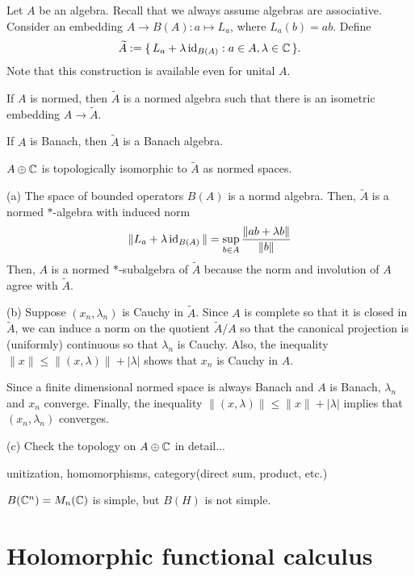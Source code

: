 \documentclass{../../large}
\begin{document}
\begin{prb}[Unitization]
Let $A$ be an algebra.
Recall that we always assume algebras are associative.
Consider an embedding $A\to B(A):a\mapsto L_a$, where $L_a(b)=ab$.
Define
\[\widetilde A:=\{\,L_a+\lambda\operatorname{id}_{B(A)}:a\in A,\lambda\in\mathbb{C}\,\}.\]
Note that this construction is available even for unital $A$.
\begin{parts}
\item If $A$ is normed, then $\tilde A$ is a normed algebra such that there is an isometric embedding $A\to\tilde A$.
\item If $A$ is Banach, then $\tilde A$ is a Banach algebra.
\item $A\oplus\mathbb{C}$ is topologically isomorphic to $\tilde A$ as normed spaces.
\end{parts}
\end{prb}
\begin{pf}
(a)
The space of bounded operators $B(A)$ is a normd algebra.
Then, $\tilde A$ is a normed $*$-algebra with induced norm
\[\|L_a+\lambda\operatorname{id}_{B(A)}\|=\sup_{b\in A}\frac{\|ab+\lambda b\|}{\|b\|}\]
Then, $A$ is a normed $*$-subalgebra of $\tilde A$ because the norm and involution of $A$ agree with $\tilde A$.

(b)
Suppose $(x_n,\lambda_n)$ is Cauchy in $\tilde A$.
Since $A$ is complete so that it is closed in $\tilde A$, we can induce a norm on the quotient $\tilde A/A$ so that the canonical projection is (uniformly) continuous so that $\lambda_n$ is Cauchy.
Also, the inequality $\|x\|\le\|(x,\lambda)\|+|\lambda|$ shows that $x_n$ is Cauchy in $A$.

Since a finite dimensional normed space is always Banach and $A$ is Banach, $\lambda_n$ and $x_n$ converge.
Finally, the inequality $\|(x,\lambda)\|\le\|x\|+|\lambda|$ implies that $(x_n,\lambda_n)$ converges.

(c)
Check the topology on $A\oplus\mathbb{C}$ in detail...
\end{pf}



unitization, homomorphisms, category(direct sum, product, etc.)

$B(\mathbb{C}^n)=M_n(\mathbb{C})$ is simple, but $B(H)$ is not simple.



\section{Holomorphic functional calculus}
\end{document}
